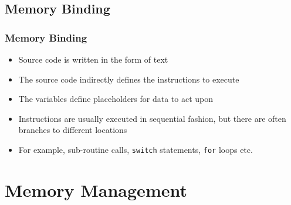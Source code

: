 \documentclass{beamer}
\begin{document}
\subsection{Memory Binding}
\begin{frame}
\frametitle{Memory Binding}
\begin{itemize}
\item Source code is written in the form of text
\item The source code indirectly defines the instructions to execute
\item The variables define placeholders for data to act upon
\item Instructions are usually executed in sequential fashion, but there are often branches to different locations
\item For example, sub-routine calls, \texttt{switch} statements, \texttt{for} loops etc.
\end{itemize}
\end{frame}
\section{Memory Management}
\end{document}
